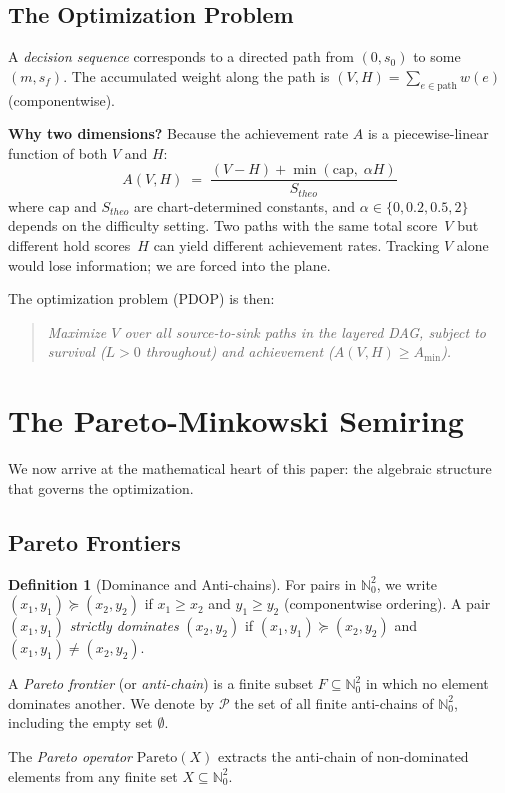 \documentclass[11pt, letterpaper]{article}
\theoremstyle{definition}
\newtheorem{definition}[theorem]{Definition}
\theoremstyle{remark}
\begin{document}
\subsection{The Optimization Problem}

A \emph{decision sequence} corresponds to a directed path from $(0, s_0)$ to some $(m, s_f)$.
The accumulated weight along the path is $(V, H) = \sum_{e \in \mathrm{path}} w(e)$ (componentwise).

\textbf{Why two dimensions?}
Because the achievement rate $A$ is a piecewise-linear function of both $V$ and $H$:
\begin{equation}
    A(V, H) \;=\; \frac{(V - H) + \min(\mathrm{cap},\; \alpha H)}{S_{\mathit{theo}}}
\end{equation}
where $\mathrm{cap}$ and $S_{\mathit{theo}}$ are chart-determined constants, and $\alpha \in \{0, 0.2, 0.5, 2\}$ depends on the difficulty setting.
Two paths with the same total score~$V$ but different hold scores~$H$ can yield different achievement rates.
Tracking $V$ alone would lose information; we are forced into the plane.

The optimization problem (PDOP) is then:
\begin{quote}
\emph{Maximize $V$ over all source-to-sink paths in the layered DAG, subject to survival ($L > 0$ throughout) and achievement ($A(V, H) \ge A_{\min}$).}
\end{quote}

\section{The Pareto-Minkowski Semiring}
\label{sec:semiring}

We now arrive at the mathematical heart of this paper: the algebraic structure that governs the optimization.

\subsection{Pareto Frontiers}

\begin{definition}[Dominance and Anti-chains]
\label{def:dominance}
For pairs in $\mathbb{N}_0^2$, we write $(x_1, y_1) \succcurlyeq (x_2, y_2)$ if $x_1 \ge x_2$ and $y_1 \ge y_2$ (componentwise ordering).
A pair $(x_1, y_1)$ \emph{strictly dominates} $(x_2, y_2)$ if $(x_1, y_1) \succcurlyeq (x_2, y_2)$ and $(x_1, y_1) \ne (x_2, y_2)$.

A \emph{Pareto frontier} (or \emph{anti-chain}) is a finite subset $F \subseteq \mathbb{N}_0^2$ in which no element dominates another.
We denote by $\mathcal{P}$ the set of all finite anti-chains of $\mathbb{N}_0^2$, including the empty set $\emptyset$.

The \emph{Pareto operator} $\mathrm{Pareto}(X)$ extracts the anti-chain of non-dominated elements from any finite set $X \subseteq \mathbb{N}_0^2$.
\end{definition}
\end{document}

